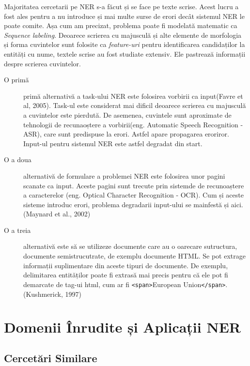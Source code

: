Majoritatea cercetarii pe NER s-a făcut și se face pe texte scrise. Acest lucru a fost ales pentru a nu introduce și mai multe surse de erori decât sistemul NER le poate comite. Așa cum am precizat, problema poate fi modelată matematic ca \textit{Sequence labeling}. Deoarece scrierea cu majusculă și alte elemente de morfologia și forma cuvintelor sunt folosite ca \textit{feature-uri} pentru identificarea candidaților la entități cu nume, textele scrise au fost studiate extensiv. Ele pastrează informații despre scrierea cuvintelor.

\begin{description}
\item[O primă] primă alternativă a task-ului NER este folosirea vorbirii ca input(Favre et al, 2005).\cite{favre2005} Task-ul este considerat mai dificil deoarece scrierea cu majusculă a cuvintelor este pierdută. De asemenea, cuvintele sunt aproximate de tehnologii de recunaoștere a vorbirii(eng. Automatic Speech Recognition - ASR), care sunt predispuse la erori. Astfel apare propagarea eroriror. Input-ul pentru sistemul NER este astfel degradat din start.

\item[O a doua] alternativă de formulare a problemei NER este folosirea unor pagini scanate ca input. Aceste pagini sunt trecute prin sistemde de recunoaștere a caracterelor (eng. Optical Character Recognition - OCR). Cum și aceste sisteme introduc erori, problema degradarii input-ului se mainfestă și aici.(Maynard et al., 2002)\cite{maynard2002}

\item[O a treia] alternativă este să se utilizeze documente care au o oarecare sutructura, documente semistrucutrate, de exemplu documente HTML. Se pot extrage informații suplimentare din aceste tipuri de documente. De exemplu, delimitarea entităților poate fi extrasă mai precis pentru că ele pot fi demarcate de tag-ui html, cum ar fi \texttt{<span>}European Union\texttt{</span>}.(Kushmerick, 1997)\cite{kushmerick1997}

\end{description}


\section{Domenii Înrudite și Aplicații NER}

\subsection{Cercetări Similare}


